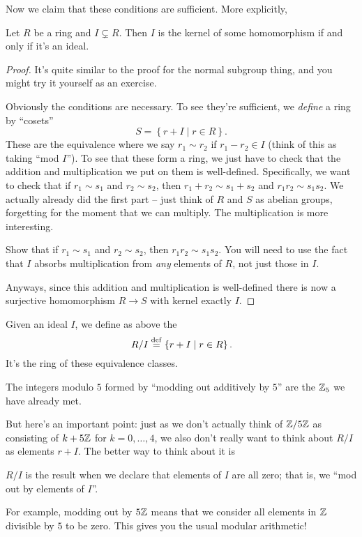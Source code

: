 Now we claim that these conditions are sufficient.
More explicitly,
\begin{theorem}
	Let $R$ be a ring and $I \subsetneq R$.
	Then $I$ is the kernel of some homomorphism if and only if it's an ideal.
\end{theorem}
\begin{proof}
	It's quite similar to the proof for the normal subgroup thing,
	and you might try it yourself as an exercise.
	
	Obviously the conditions are necessary.
	To see they're sufficient, we \emph{define} a ring by ``cosets''
	\[ S = \left\{ r + I \mid r \in R \right\}. \]
	These are the equivalence where we say $r_1 \sim r_2$ if $r_1 - r_2 \in I$
	(think of this as taking ``mod $I$'').
	To see that these form a ring, we just have to check that the addition
	and multiplication we put on them is well-defined.
	Specifically, we want to check that if $r_1 \sim s_1$ and $r_2 \sim s_2$,
	then $r_1 + r_2 \sim s_1 + s_2$ and $r_1r_2 \sim s_1s_2$.
	We actually already did the first part -- just think of $R$ and $S$ as abelian
	groups, forgetting for the moment that we can multiply.
	The multiplication is more interesting.
	\begin{exercise}
		[Recommended]
		Show that if $r_1 \sim s_1$ and $r_2 \sim s_2$, then $r_1r_2 \sim s_1s_2$.
		You will need to use the fact that $I$ absorbs multiplication
		from \emph{any} elements of $R$, not just those in $I$.
	\end{exercise}
	Anyways, since this addition and multiplication is well-defined there
	is now a surjective homomorphism $R \to S$ with kernel exactly $I$.
\end{proof}

\begin{definition}
	Given an ideal $I$, we define as above the 
	\[ R/I \overset{\mathrm{def}}{=} \left\{ r+I \mid r \in R \right\}. \]
	It's the ring of these equivalence classes.
\end{definition}
\begin{example}[$\ZZ/5\ZZ$]
	The integers modulo $5$ formed by ``modding out additively by $5$''
	are the $\mathbb Z_{5}$ we have already met.
\end{example}
But here's an important point:
just as we don't actually think of $\ZZ/5\ZZ$ as consisting of
$k + 5\mathbb Z$ for $k=0,\dots,4$,
we also don't really want to think about $R/I$ as elements $r+I$.
The better way to think about it is
\begin{moral}
	$R/I$ is the result when we declare that elements of $I$ are all zero;
	that is, we ``mod out by elements of $I$''.
\end{moral}
For example, modding out by $5\mathbb Z$ means that we consider
all elements in $\mathbb Z$ divisible by $5$ to be zero.
This gives you the usual modular arithmetic!


